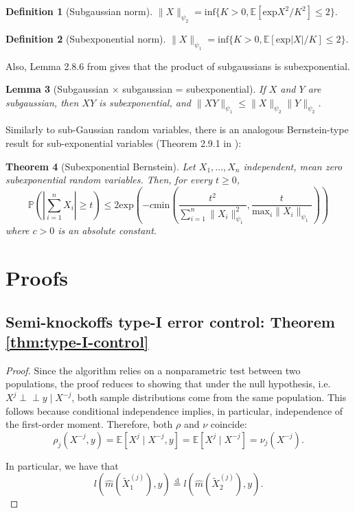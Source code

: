 \documentclass{article}
\theoremstyle{plain}
\newtheorem{theorem}{Theorem}[section]
\newtheorem{lemma}[theorem]{Lemma}
\theoremstyle{definition}
\newtheorem{definition}[theorem]{Definition}
\theoremstyle{remark}
\newcommand{\indep}{\perp\!\!\!\perp}
\newcommand{\e}[1]{\mathbb{E}\left[#1\right]  } %
\begin{document}
\begin{definition}[Subgaussian norm]\label{def:subgaussian_norm}
$\|X\|_{\psi_2}=\mathrm{inf}\{K>0, \e{\mathrm{exp}X^2/K^2}\leq 2\}$.
\end{definition}

\begin{definition}[Subexponential norm]
$\|X\|_{\psi_1}=\mathrm{inf}\{K>0, \e{\mathrm{exp}|X|/K}\leq 2\}$.
\end{definition}

Also, Lemma 2.8.6 from \citet{Vershynin_2018} gives that the product of subgaussians is subexponential.
\begin{lemma}[Subgaussian $\times$ subgaussian = subexponential]\label{lemm:subG_x_subG} If $X$ and $Y$ are subgaussian, then $XY$ is subexponential, and 
$\|XY\|_{\psi_1}\leq \|X\|_{\psi_2}\|Y\|_{\psi_2}$.

\end{lemma}

Similarly to sub-Gaussian random variables, there is an analogous Bernstein-type result for sub-exponential variables (Theorem 2.9.1 in \citet{Vershynin_2018}):
\begin{theorem}[Subexponential Bernstein]\label{th:bernstein} Let $X_1, \ldots, X_n$ independent, mean zero subexponential random variables. Then, for every $t\geq 0$, 
$$\mathbb{P}\left(\left|\sum_{i=1}^n X_i\right|\geq t\right)\leq 2\mathrm{exp}\left(-c\mathrm{min}\left(\frac{t^2}{\sum_{i=1}^n\|X_i\|^2_{\psi_1}}, \frac{t}{\mathrm{max}_i\|X_i\|_{\psi_1}}\right)\right)$$
where $c>0$ is an absolute constant.
\end{theorem}






\section{Proofs}
\subsection{Semi-knockoffs type-I error control: Theorem \ref{thm:type-I-control}}


\begin{proof}
Since the algorithm relies on a nonparametric test between two populations, the proof reduces to showing that under the null hypothesis, i.e.\ $X^j \indep y \mid X^{-j}$, both sample distributions come from the same population. This follows because conditional independence implies, in particular, independence of the first-order moment. Therefore, both $\rho$ and $\nu$ coincide:
\[
\rho_j(X^{-j}, y)
= \mathbb{E}[X^j \mid X^{-j}, y]
= \mathbb{E}[X^j \mid X^{-j}]
= \nu_j(X^{-j}).
\]

In particular, we have that
\[
l(\widehat{m}(\widetilde{X}^{(j)}_1), y)
\overset{\mathrm{d}}{=}
l(\widehat{m}(\widetilde{X}^{(j)}_2), y).
\]
\end{proof}
\end{document}
